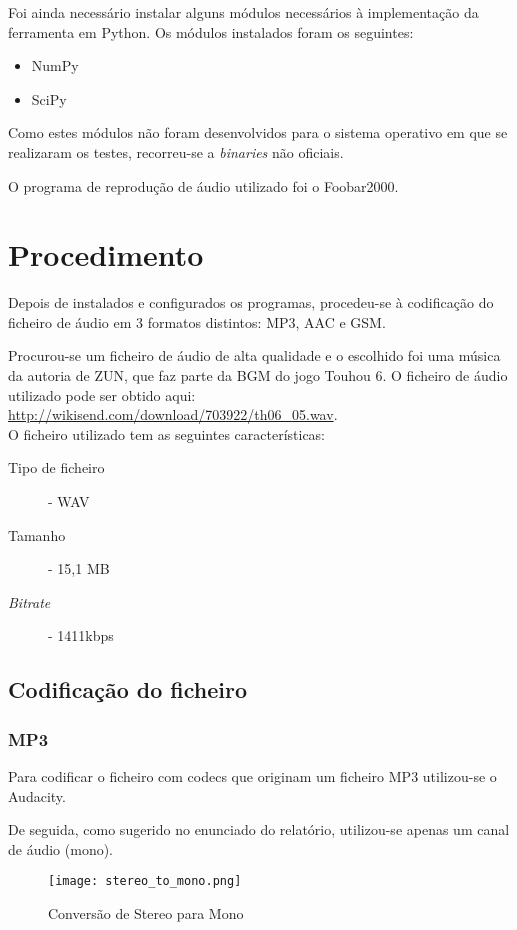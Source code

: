 \documentclass[a4paper]{report}
\begin{document}
Foi ainda necessário instalar alguns módulos necessários à implementação da ferramenta em Python. Os módulos instalados foram os seguintes:
\begin{itemize}
\item NumPy
\item SciPy
\end{itemize}

Como estes módulos não foram desenvolvidos para o sistema operativo em que se realizaram os testes, recorreu-se a \textit{binaries}\cite{Binaries} não oficiais.

O programa de reprodução de áudio utilizado foi o Foobar2000\cite{Foobar}.

\clearpage

\chapter{Procedimento}
\label{procedimento}

Depois de instalados e configurados os programas, procedeu-se à codificação do ficheiro de áudio em 3 formatos distintos: \gls{MP3}, \gls{AAC} e \gls{GSM}.

Procurou-se um ficheiro de áudio de alta qualidade e o escolhido foi uma música da autoria de ZUN, que faz parte da BGM do jogo Touhou 6\cite{TouhouProject}. O ficheiro de áudio utilizado pode ser obtido aqui: \url{http://wikisend.com/download/703922/th06_05.wav}.
\\[5pt]
O ficheiro utilizado tem as seguintes características:
\begin{description}
\item[Tipo de ficheiro] - WAV
\item[Tamanho] - 15,1 MB
\item[\textit{Bitrate}] - 1411kbps
\end{description}
\clearpage
\section{Codificação do ficheiro}
\label{codification}
\subsection{MP3}
\label{mp3codec}
Para codificar o ficheiro com codecs que originam um ficheiro \gls{MP3} utilizou-se o Audacity.

De seguida, como sugerido no enunciado do relatório, utilizou-se apenas um canal de áudio (mono).
\\
\begin{figure}[h!]
 \texttt{[image: stereo\_to\_mono.png]}
 \caption{Conversão de Stereo para Mono}
 \label{stereotomono}
\end{figure}
\end{document}
